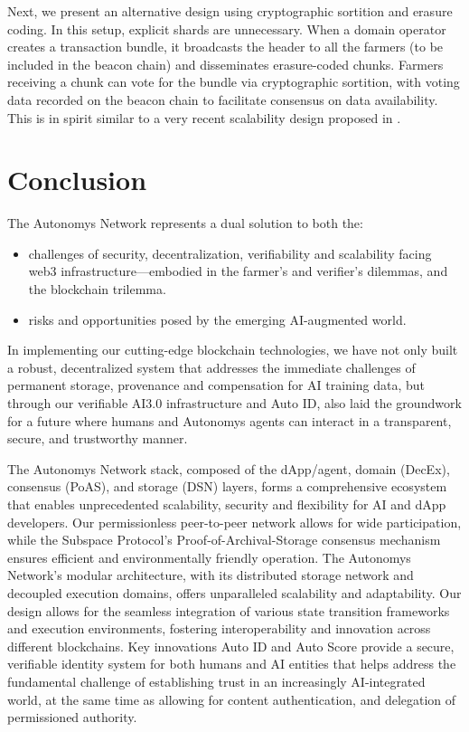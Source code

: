 \documentclass[conference]{IEEEtran}
\begin{document}
Next, we present an alternative design using cryptographic sortition and erasure coding. In this setup, explicit shards are unnecessary. When a domain operator creates a transaction bundle, it broadcasts the header to all the farmers (to be included in the beacon chain) and disseminates erasure-coded chunks. Farmers receiving a chunk can vote for the bundle via cryptographic sortition, with voting data recorded on the beacon chain to facilitate consensus on data availability. This is in spirit similar to a very recent scalability design proposed in \cite{rollup2024}.

\section{Conclusion}

The Autonomys Network represents a dual solution to both the:
\begin{itemize}
    \item challenges of security, decentralization, verifiability and scalability facing web3 infrastructure—embodied in the farmer's and verifier's dilemmas, and the blockchain trilemma.
    \item risks and opportunities posed by the emerging AI-augmented world.
\end{itemize}

In implementing our cutting-edge blockchain technologies, we have not only built a robust, decentralized system that addresses the immediate challenges of permanent storage, provenance and compensation for AI training data, but through our verifiable AI3.0 infrastructure and Auto ID, also laid the groundwork for a future where humans and Autonomys agents can interact in a transparent, secure, and trustworthy manner. 

The Autonomys Network stack, composed of the dApp/agent, domain (DecEx), consensus (PoAS), and storage (DSN) layers, forms a comprehensive ecosystem that enables unprecedented scalability, security and flexibility for AI and dApp developers. Our permissionless peer-to-peer network allows for wide participation, while the Subspace Protocol's Proof-of-Archival-Storage consensus mechanism ensures efficient and environmentally friendly operation. The Autonomys Network's modular architecture, with its distributed storage network and decoupled execution domains, offers unparalleled scalability and adaptability. Our design allows for the seamless integration of various state transition frameworks and execution environments, fostering interoperability and innovation across different blockchains. Key innovations Auto ID and Auto Score provide a secure, verifiable identity system for both humans and AI entities that helps address the fundamental challenge of establishing trust in an increasingly AI-integrated world, at the same time as allowing for content authentication, and delegation of permissioned authority.
\end{document}

